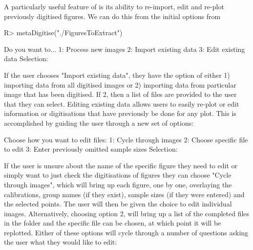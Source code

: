 \documentclass[article]{jss}
\newcommand{\fct}[1]{\code{#1()}}
\begin{document}
A particularly useful feature of  is its ability to re-import, edit and re-plot previously digitised figures. We can do this from the initial options from \fct{metaDigitise}


\begin{CodeChunk}
\begin{CodeInput}
R> metaDigitise("./FiguresToExtract")
\end{CodeInput}
\begin{CodeOutput}
    Do you want to...
1: Process new images
2: Import existing data
3: Edit existing data
Selection: 
\end{CodeOutput}
\end{CodeChunk}

If the user chooses "Import existing data", they have the option of either 1) importing data from all digitised images or 2) importing data from particular image that has been digitised. If 2, then a list of files are provided to the user that they can select. Editing existing data allows users to easily re-plot or edit information or digitisations that have previously be done for any plot. This is accomplished by guiding the user through a new set of options:

\begin{CodeChunk}
\begin{CodeOutput}
Choose how you want to edit files:
1: Cycle through images
2: Choose specific file to edit
3: Enter previously omitted sample sizes
Selection: 
\end{CodeOutput}
\end{CodeChunk}

If the user is unsure about the name of the specific figure they need to edit or simply want to just check the digitisations of figures they can choose "Cycle through images", which will bring up each figure, one by one, overlaying the calibrations, group names (if they exist), sample sizes (if they were entered) and the selected points. The user will then be given the choice to edit individual images. Alternatively, choosing option 2, will bring up a list of the completed files in the folder and the specific file can be chosen, at which point it will be replotted. Either of these options will cycle through a number of questions asking the user what they would like to edit:
\end{document}
